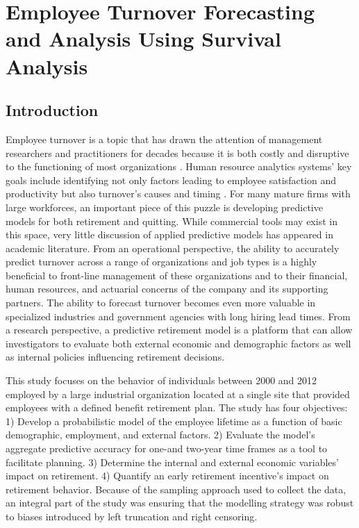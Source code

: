 \chapter{Employee Turnover Forecasting and Analysis Using Survival Analysis} \label{ch:surv}
\section{Introduction}
Employee turnover is a topic that has drawn the attention of management researchers and practitioners for decades because it is both costly and disruptive to the functioning of most organizations \citep{staw1980, mueller1989, kacmar2006}. Human resource analytics systems' key goals include identifying not only factors leading to employee satisfaction and productivity but also turnover's causes and timing \citep{IBM}. For many mature firms with large workforces, an important piece of this puzzle is developing predictive models for both retirement and quitting.  While commercial tools may exist in this space, very little discussion of applied predictive models has appeared in academic literature.  From an operational perspective, the ability to accurately predict turnover across a range of organizations and job types is a highly beneficial to front-line management of these organizations and to their financial, human resources, and actuarial concerns of the company and its supporting partners. The ability to forecast turnover becomes even more valuable in specialized industries and government agencies with long hiring lead times. From a research perspective, a predictive retirement model is a platform that can allow investigators to evaluate both external economic and demographic factors as well as internal policies influencing retirement decisions.

This study focuses on the behavior of individuals between 2000 and 2012 employed by a large industrial organization located at a single site that provided employees with a defined benefit retirement plan. The study has four objectives: 1) Develop a probabilistic model of the employee lifetime as a function of basic demographic, employment, and external factors.  2) Evaluate the model's aggregate predictive accuracy for one-and two-year time frames as a tool to facilitate planning. 3) Determine the internal and external economic variables' impact on retirement. 4) Quantify an early retirement incentive's impact on retirement behavior. Because of the sampling approach used to collect the data, an integral part of the study was ensuring that the modelling strategy was robust to biases introduced by left truncation and right censoring.

